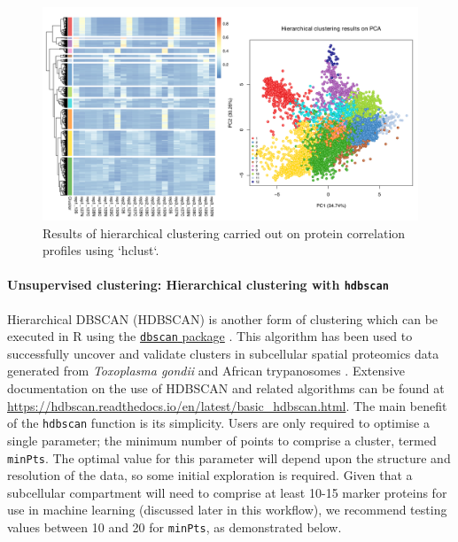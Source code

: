 \documentclass[9pt,a4paper,]{extarticle}
\begin{document}
\begin{figure}[H]

{\centering \includegraphics[width=1\linewidth,]{figs/hierarchical_clustering_horizontal} 

}

\caption{Results of hierarchical clustering carried out on protein correlation profiles using `hclust`.}\label{fig:hierarchical-clustering}
\end{figure}

\paragraph{\texorpdfstring{Unsupervised clustering: Hierarchical clustering with \texttt{hdbscan}}{Unsupervised clustering: Hierarchical clustering with hdbscan}}\label{unsupervised-clustering-hierarchical-clustering-with-hdbscan}

Hierarchical DBSCAN (HDBSCAN) is another form of clustering which can be
executed in R using the \href{https://cran.r-project.org/web/packages/dbscan/index.html}{\texttt{dbscan} package} \citep{Hahsler2019}. This algorithm has been used to successfully uncover and validate
clusters in subcellular spatial proteomics data generated from \emph{Toxoplasma gondii} \citep{Barylyuk2020}
and African trypanosomes \citep{Moloney2023}. Extensive documentation on the use of
HDBSCAN and related algorithms can be found at \url{https://hdbscan.readthedocs.io/en/latest/basic_hdbscan.html}. The main benefit of the \texttt{hdbscan} function is its simplicity. Users are only
required to optimise a single parameter; the minimum number of points to
comprise a cluster, termed \texttt{minPts}. The optimal value for this parameter will
depend upon the structure and resolution of the data, so some initial
exploration is required. Given that a subcellular compartment will need to
comprise at least 10-15 marker proteins for use in machine learning (discussed
later in this workflow), we recommend testing values between 10 and 20 for
\texttt{minPts}, as demonstrated below.
\end{document}
